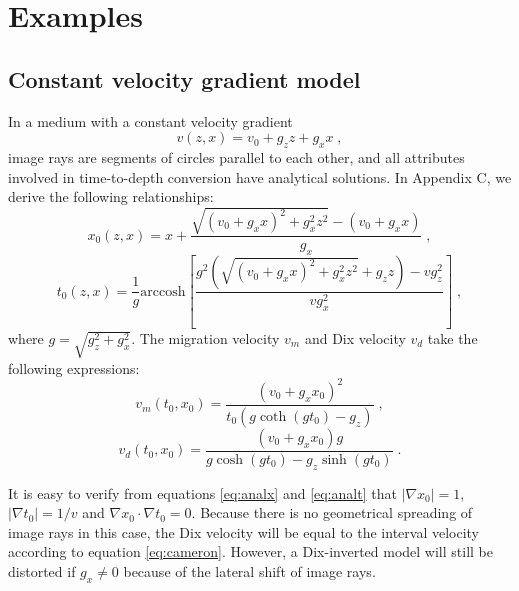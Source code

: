 \section{Examples}

\subsection{Constant velocity gradient model}

In a medium with a constant velocity gradient
\begin{equation}
\label{eq:constg0}
v (z,x) = v_0 + g_z z + g_x x\;,
\end{equation}
image rays are segments of circles parallel to each other, and all attributes involved in time-to-depth 
conversion have analytical solutions. In Appendix C, we derive the following 
relationships:
\begin{equation}
\label{eq:analx}
x_0 (z,x) = x + \frac{\sqrt{(v_0+g_x x)^2 + g_x^2 z^2} - (v_0 + g_x x)}{g_x}\;,
\end{equation}
\begin{equation}
\label{eq:analt}
t_0 (z,x) = \frac{1}{g} \mathrm{arccosh} \left[ \frac{g^2 \left( \sqrt{(v_0+g_x x)^2 + g_x^2 z^2}
+ g_z z \right) - v g_z^2}{v g_x^2} \right]\;,
\end{equation}
where $g = \sqrt{g_z^2 + g_x^2}$. The migration velocity $v_m$ and Dix velocity $v_d$ take the 
following expressions:
\begin{equation}
\label{eq:analvm}
v_m (t_0,x_0) = \frac{(v_0 + g_x x_0)^2}{t_0 \left( g \coth (g t_0) - g_z \right)}\;,
\end{equation}
\begin{equation}
\label{eq:analvd}
v_d (t_0,x_0) = \frac{(v_0 + g_x x_0) g}{g \cosh (g t_0) - g_z \sinh (g t_0)}\;.
\end{equation}

It is easy to verify from equations \ref{eq:analx} and \ref{eq:analt} that 
$|\nabla x_0| = 1$, $|\nabla t_0| = 1/v$ and $\nabla x_0 \cdot \nabla t_0 = 0$. Because there is no geometrical 
spreading of image rays in this case, the Dix velocity will be equal to the interval velocity according to 
equation \ref{eq:cameron}. However, a Dix-inverted model will still be distorted if $g_x \not= 0$ because of the 
lateral shift of image rays.

